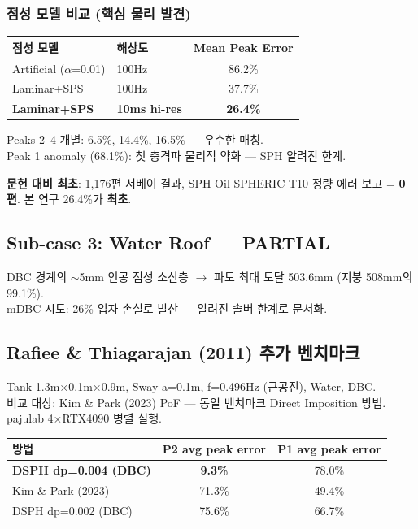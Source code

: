 \documentclass[10pt,a4paper]{article}
\begin{document}
\subsubsection{점성 모델 비교 (핵심 물리 발견)}

\begin{center}
\renewcommand{\arraystretch}{1.2}
\begin{tabular}{llc}
\toprule
점성 모델 & 해상도 & Mean Peak Error \\
\midrule
Artificial ($\alpha$=0.01) & 100Hz & 86.2\% \\
Laminar+SPS & 100Hz & 37.7\% \\
\textbf{Laminar+SPS} & \textbf{10ms hi-res} & \textbf{26.4\%} \\
\bottomrule
\end{tabular}
\end{center}

Peaks 2--4 개별: 6.5\%, 14.4\%, 16.5\% — 우수한 매칭.\\
Peak 1 anomaly (68.1\%): 첫 충격파 물리적 약화 — SPH 알려진 한계.

\textbf{문헌 대비 최초}: 1,176편 서베이 결과, SPH Oil SPHERIC T10 정량 에러 보고 = \textbf{0편}. 본 연구 26.4\%가 \textbf{최초}.

\subsection{Sub-case 3: Water Roof — \textcolor{partial}{PARTIAL}}

DBC 경계의 $\sim$5mm 인공 점성 소산층 $\rightarrow$ 파도 최대 도달 503.6mm (지붕 508mm의 99.1\%).\\
mDBC 시도: 26\% 입자 손실로 발산 — 알려진 솔버 한계로 문서화.

\subsection{Rafiee \& Thiagarajan (2011) 추가 벤치마크}

Tank 1.3m$\times$0.1m$\times$0.9m, Sway a=0.1m, f=0.496Hz (근공진), Water, DBC.\\
비교 대상: Kim \& Park (2023) PoF — 동일 벤치마크 Direct Imposition 방법.\\
pajulab 4$\times$RTX4090 병렬 실행.

\begin{center}
\renewcommand{\arraystretch}{1.2}
\begin{tabular}{lcc}
\toprule
방법 & P2 avg peak error & P1 avg peak error \\
\midrule
\textbf{DSPH dp=0.004 (DBC)} & \textbf{9.3\%} & 78.0\% \\
Kim \& Park (2023) & 71.3\% & 49.4\% \\
DSPH dp=0.002 (DBC) & 75.6\% & 66.7\% \\
\bottomrule
\end{tabular}
\end{center}
\end{document}
